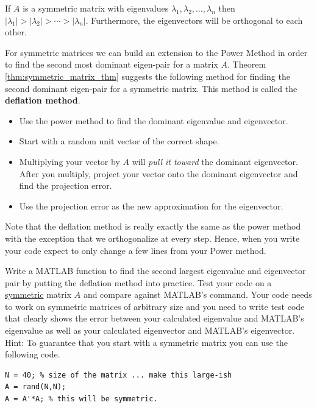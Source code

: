 \begin{thm}\label{thm:symmetric_matrix_thm}
    If $A$ is a symmetric matrix with eigenvalues $\lambda_1, \lambda_2, \ldots,
    \lambda_n$ then $|\lambda_1| > |\lambda_2| > \cdots > |\lambda_n|$.  Furthermore, the
    eigenvectors will be orthogonal to each other. 
\end{thm}


\begin{problem}
    For symmetric matrices we can build an extension to the Power Method in order
    to find the second most dominant eigen-pair for a matrix $A$.  Theorem
    \ref{thm:symmetric_matrix_thm} suggests the following method for finding the second
    dominant eigen-pair for a symmetric matrix.  This method is called the {\bf deflation
    method}.
    \begin{itemize}
        \item Use the power method to find the dominant eigenvalue and eigenvector.
        \item Start with a random unit vector of the correct shape.
        \item Multiplying your vector by $A$ will {\it pull it toward} the dominant
            eigenvector.  After you multiply, project your vector onto the dominant
            eigenvector and find the projection error.  
        \item Use the projection error as the new approximation for the eigenvector.
    \end{itemize}    

    Note that the deflation method is really exactly the same as the power method with the
    exception that we orthogonalize at every step.  Hence, when you write your code expect
    to only change a few lines from your Power method.

    Write a
    MATLAB function  to find the second largest eigenvalue and
    eigenvector pair by putting the deflation method into practice. Test your code on a
    \underline{symmetric} matrix $A$ and compare against MATLAB's  command.
    Your code needs to work on symmetric matrices of arbitrary size and you need to write
    test code that clearly shows the error between your calculated eigenvalue and MATLAB's
    eigenvalue as well as your calculated eigenvector and MATLAB's eigenvector.\\ Hint: To
    guarantee that you start with a symmetric matrix you can use the following code.
\begin{lstlisting}
N = 40; % size of the matrix ... make this large-ish
A = rand(N,N);
A = A'*A; % this will be symmetric.
\end{lstlisting}
\end{problem}

